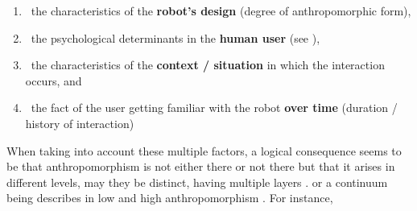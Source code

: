 \documentclass{frontiersSCNS} %
\begin{document}
\begin{enumerate}
\item ~the characteristics of the \textbf{robot's design} (degree of anthropomorphic form),
\item ~the psychological determinants in the \textbf{human user} (see
\cite{epley_seeing_2007}),
\item ~the characteristics of the \textbf{context / situation} in which the interaction occurs, and
\item ~the fact of the user getting familiar with the robot \textbf{over time} (duration / history of interaction)
\end{enumerate}



%

When taking into account these multiple factors, a logical consequence seems to be that anthropomorphism is not either there or not there but that it arises in different levels, may they be distinct, having multiple layers \citep{persson_anthropomorphism_2000}. or a continuum being describes in low and high anthropomorphism \citep{ruijten_introducing_2014}. For instance, 
\end{document}
